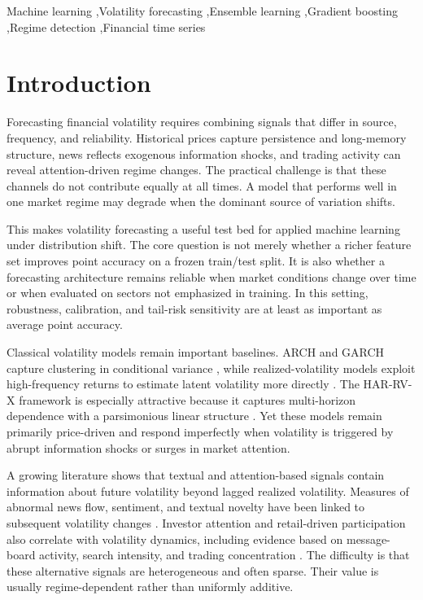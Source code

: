 \documentclass[review]{elsarticle}
\begin{document}
\begin{frontmatter}
\begin{keyword}
Machine learning \sep Volatility forecasting \sep Ensemble learning \sep Gradient boosting \sep Regime detection \sep Financial time series
\end{keyword}

\end{frontmatter}

\section{Introduction}\label{introduction}

Forecasting financial volatility requires combining signals that differ in source, frequency, and reliability. Historical prices capture persistence and long-memory structure, news reflects exogenous information shocks, and trading activity can reveal attention-driven regime changes. The practical challenge is that these channels do not contribute equally at all times. A model that performs well in one market regime may degrade when the dominant source of variation shifts.

This makes volatility forecasting a useful test bed for applied machine learning under distribution shift. The core question is not merely whether a richer feature set improves point accuracy on a frozen train/test split. It is also whether a forecasting architecture remains reliable when market conditions change over time or when evaluated on sectors not emphasized in training. In this setting, robustness, calibration, and tail-risk sensitivity are at least as important as average point accuracy.

Classical volatility models remain important baselines. ARCH and GARCH capture clustering in conditional variance \cite{engle1982,bollerslev1986}, while realized-volatility models exploit high-frequency returns to estimate latent volatility more directly \cite{andersen2001}. The HAR-RV-X framework is especially attractive because it captures multi-horizon dependence with a parsimonious linear structure \cite{corsi2009}. Yet these models remain primarily price-driven and respond imperfectly when volatility is triggered by abrupt information shocks or surges in market attention.

A growing literature shows that textual and attention-based signals contain information about future volatility beyond lagged realized volatility. Measures of abnormal news flow, sentiment, and textual novelty have been linked to subsequent volatility changes \cite{tetlock2007,glasserman2019,bodilsen2025}. Investor attention and retail-driven participation also correlate with volatility dynamics, including evidence based on message-board activity, search intensity, and trading concentration \cite{antweiler2004,barber2008,da2011,vlastakis2012,audrino2020}. The difficulty is that these alternative signals are heterogeneous and often sparse. Their value is usually regime-dependent rather than uniformly additive.
\end{document}
